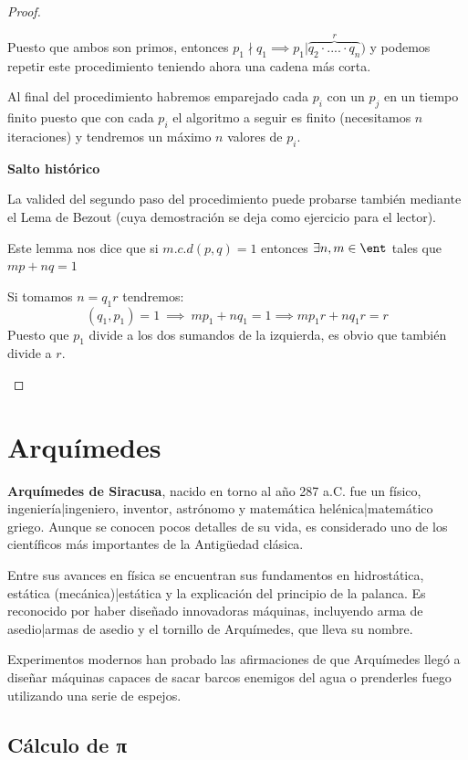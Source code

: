 \documentclass{apuntes}
\begin{document}
\begin{proof}
\begin{enumerate}
\begin{enumerate}
Puesto que ambos son primos, entonces $p_1 \nmid q_1 \implies p_1 | \overbrace{q_2\cdot .... \cdot q_n}^r)$ y podemos repetir este procedimiento teniendo ahora una cadena más corta.
\end{enumerate}

Al final del procedimiento habremos emparejado cada $p_i$ con un $p_j$ en un tiempo finito puesto que con cada $p_i$ el algoritmo a seguir es finito (necesitamos $n$ iteraciones) y tendremos un máximo $n$ valores de $p_i$.

\begin{mdframed}
\textbf{Salto histórico}

La valided del segundo paso del procedimiento puede probarse también mediante el Lema de Bezout (cuya demostración se deja como ejercicio para el lector).

Este lemma nos dice que si $m.c.d(p,q)=1$ entonces $\exists n,m\in \ent $ tales que $mp+nq =1$

Si tomamos $n=q_1r$ tendremos:
\[(q_1,p_1) = 1 \ \implies \ mp_1+nq_1 = 1 \implies mp_1r +nq_1r = r\]
Puesto que $p_1$ divide a los dos sumandos de la izquierda, es obvio que también divide a $r$.
\end{mdframed}
\end{enumerate}
\end{proof}

\section{Arquímedes}
\textbf{Arquímedes de Siracusa}, nacido en torno al año 287 a.C. fue un físico, ingeniería|ingeniero, inventor, astrónomo y matemática helénica|matemático griego. Aunque se conocen pocos detalles de su vida, es considerado uno de los científicos más importantes de la Antigüedad clásica.

Entre sus avances en física se encuentran sus fundamentos en hidrostática, estática (mecánica)|estática y la explicación del principio de la palanca. Es reconocido por haber diseñado innovadoras máquinas, incluyendo arma de asedio|armas de asedio y el tornillo de Arquímedes, que lleva su nombre.

Experimentos modernos han probado las afirmaciones de que Arquímedes llegó a diseñar máquinas capaces de sacar barcos enemigos del agua o prenderles fuego utilizando una serie de espejos.


\subsection{Cálculo de π}
\end{document}
